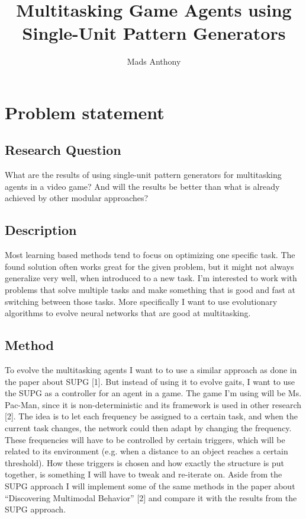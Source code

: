 \documentclass[11pt, a4paper]{article}
\begin{document}
\title{Multitasking Game Agents using Single-Unit Pattern Generators}
\author{Mads Anthony}
\maketitle
\section{Problem statement}
\subsection{Research Question}
What are the results of using single-unit pattern generators for multitasking agents in a video game? And will the results be better than what is already achieved by other modular approaches?
\subsection{Description}
Most learning based methods tend to focus on optimizing one specific task. The found solution often works great for the given problem, but it might not always generalize very well, when introduced to a new task. I’m interested to work with problems that solve multiple tasks and make something that is good and fast at switching between those tasks. More specifically I want to use evolutionary algorithms to evolve neural networks that are good at multitasking.
\subsection{Method}
To evolve the multitasking agents I want to to use a similar approach as done in the paper about SUPG [1]. But instead of using it to evolve gaits, I want to use the SUPG as a controller for an agent in a game. The game I’m using will be Ms. Pac-Man, since it is non-deterministic and its framework is used in other research [2]. The idea is to let each frequency be assigned to a certain task, and when the current task changes, the network could then adapt by changing the frequency. These frequencies will have to be controlled by certain triggers, which will be related to its environment (e.g. when a distance to an object reaches a certain threshold). How these triggers is chosen and how exactly the structure is put together, is something I will have to tweak and re-iterate on. Aside from the SUPG approach I will implement some of the same methods in the paper about “Discovering Multimodal Behavior” [2] and compare it with the results from the SUPG approach.
\end{document}
